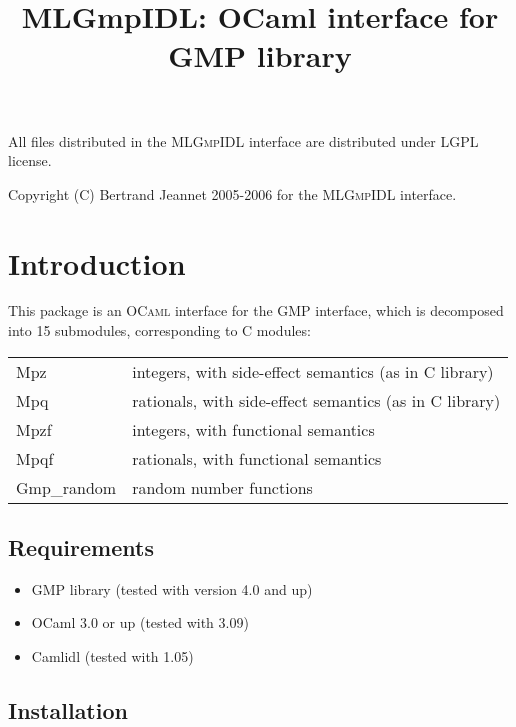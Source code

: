 \documentclass[[twoside,10pt,a4paper]{report}
\title{MLGmpIDL: OCaml interface for GMP library}
\begin{document}
\maketitle


\vspace*{0.9\textheight}

All files distributed in the \textsc{MLGmpIDL} interface are
distributed under LGPL license.

Copyright (C) Bertrand Jeannet 2005-2006 for the
\textsc{MLGmpIDL} interface.

\newpage

\section*{Introduction}

This package is an \textsc{OCaml} interface for the GMP
interface, which is decomposed into 15 submodules, corresponding to C
modules:

\noindent
\begin{tabular}{l@{~:~~}l}
Mpz        & integers, with side-effect semantics (as in C library) \\
Mpq        & rationals, with side-effect semantics (as in C library) \\
Mpzf       & integers, with functional semantics  \\
Mpqf       & rationals, with functional semantics \\
Gmp\_random & random number functions
\end{tabular}

\subsection*{Requirements}

\begin{itemize}
\item GMP library (tested with version 4.0 and up)
\item OCaml 3.0 or up (tested with 3.09)
\item Camlidl (tested with 1.05)
\end{itemize}

\subsection*{Installation}
\end{document}
